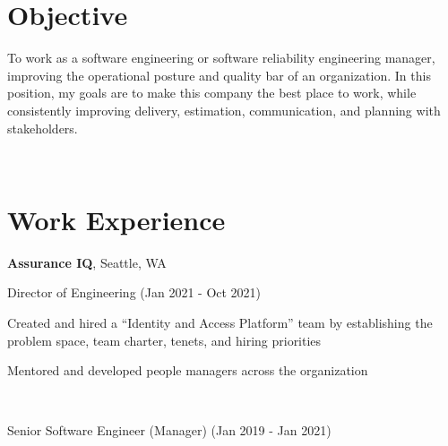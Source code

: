 \documentclass[letterpaper]{resume}
\begin{document}
\author{Christopher John Wallace}
\maketitle

\section{Objective}
\begin{compactitem}
\item
    To work as a software engineering or software reliability engineering
    manager, improving the operational posture and quality bar of an
    organization. In this position, my goals are to make this company the best
    place to work, while consistently improving delivery, estimation,
    communication, and planning with stakeholders.
\end{compactitem}

~

\section{Work Experience}

\textbf{Assurance IQ}, Seattle, WA

Director of Engineering (Jan 2021 - Oct 2021)

\begin{compactitem}

\item Created and hired a ``Identity and Access Platform'' team by establishing
    the problem space, team charter, tenets, and hiring priorities
\item Mentored and developed people managers across the organization

\end{compactitem}

~

Senior Software Engineer (Manager) (Jan 2019 - Jan 2021)
\end{document}
